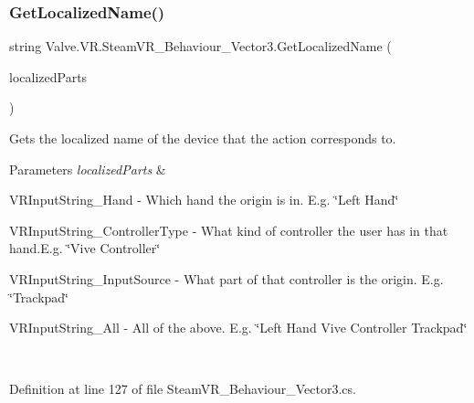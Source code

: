 \mbox{\label{class_valve_1_1_v_r_1_1_steam_v_r___behaviour___vector3_ad2338609404a6cb74b165e44fc89a606}} 
\subsubsection{\texorpdfstring{GetLocalizedName()}{GetLocalizedName()}}
{\footnotesize\ttfamily string Valve.\+V\+R.\+Steam\+V\+R\+\_\+\+Behaviour\+\_\+\+Vector3.\+Get\+Localized\+Name (\begin{DoxyParamCaption}\item[{params \mbox{\hyperlink{namespace_valve_1_1_v_r_a05e76187bbc5846b9bfb44f6acf13912}{E\+V\+R\+Input\+String\+Bits}} \mbox{[}$\,$\mbox{]}}]{localized\+Parts }\end{DoxyParamCaption})}



Gets the localized name of the device that the action corresponds to. 


\begin{DoxyParams}{Parameters}
{\em localized\+Parts} & 
\begin{DoxyItemize}
\item V\+R\+Input\+String\+\_\+\+Hand -\/ Which hand the origin is in. E.\+g. \char`\"{}\+Left Hand\char`\"{} 
\item V\+R\+Input\+String\+\_\+\+Controller\+Type -\/ What kind of controller the user has in that hand.\+E.\+g. \char`\"{}\+Vive Controller\char`\"{} 
\item V\+R\+Input\+String\+\_\+\+Input\+Source -\/ What part of that controller is the origin. E.\+g. \char`\"{}\+Trackpad\char`\"{} 
\item V\+R\+Input\+String\+\_\+\+All -\/ All of the above. E.\+g. \char`\"{}\+Left Hand Vive Controller Trackpad\char`\"{} 
\end{DoxyItemize}\\
\hline
\end{DoxyParams}


Definition at line 127 of file Steam\+V\+R\+\_\+\+Behaviour\+\_\+\+Vector3.\+cs.

\mbox{\label{class_valve_1_1_v_r_1_1_steam_v_r___behaviour___vector3_a32e697139f8cc49fdda33df312f16117}} 

